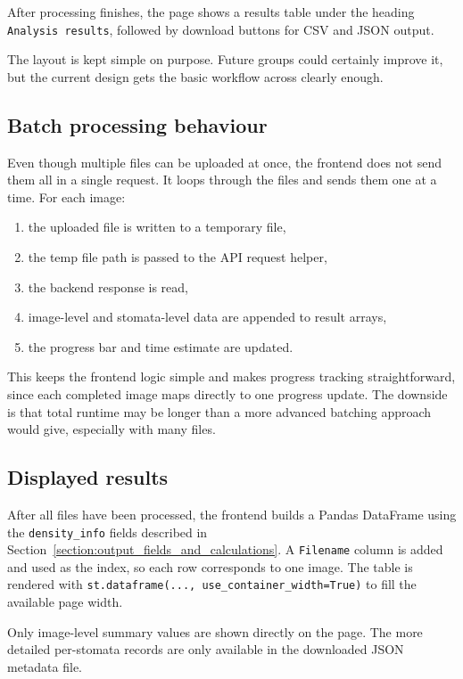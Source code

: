 \documentclass{article}
\begin{document}
After processing finishes, the page shows a results table under the heading \texttt{Analysis results}, followed by download buttons for CSV and JSON output.

The layout is kept simple on purpose. Future groups could certainly improve it, but the current design gets the basic workflow across clearly enough.

\subsection{Batch processing behaviour}

Even though multiple files can be uploaded at once, the frontend does not send them all in a single request. It loops through the files and sends them one at a time. For each image:

\begin{enumerate}
    \item the uploaded file is written to a temporary file,
    \item the temp file path is passed to the API request helper,
    \item the backend response is read,
    \item image-level and stomata-level data are appended to result arrays,
    \item the progress bar and time estimate are updated.
\end{enumerate}

This keeps the frontend logic simple and makes progress tracking straightforward, since each completed image maps directly to one progress update. The downside is that total runtime may be longer than a more advanced batching approach would give, especially with many files.

\subsection{Displayed results}

After all files have been processed, the frontend builds a Pandas DataFrame using the \texttt{density\_info} fields described in Section~\ref{section:output_fields_and_calculations}. A \texttt{Filename} column is added and used as the index, so each row corresponds to one image. The table is rendered with \texttt{st.dataframe(..., use\_container\_width=True)} to fill the available page width.

Only image-level summary values are shown directly on the page. The more detailed per-stomata records are only available in the downloaded JSON metadata file.
\end{document}
